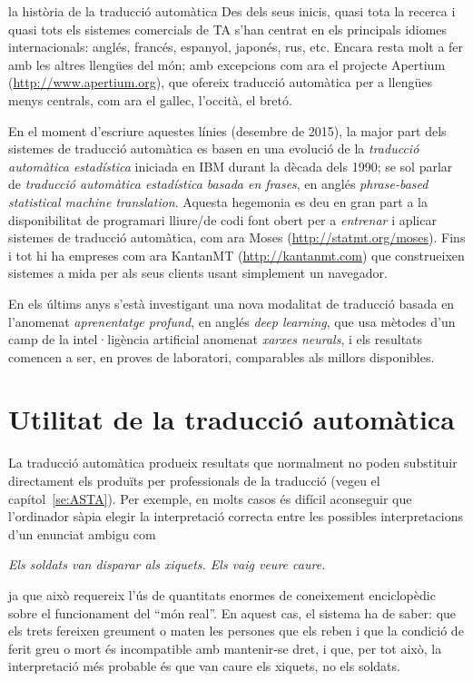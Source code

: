 \begin{persabermes}{la història de la traducció automàtica}
  Des dels seus inicis, quasi tota la recerca i quasi tots els
  sistemes comercials de TA s'han centrat en els principals idiomes
  internacionals: anglés, francés, espanyol, japonés, rus, etc.
  Encara resta molt a fer amb les altres llengües del món; amb
  excepcions com ara el projecte Apertium
  (\url{http://www.apertium.org}), que ofereix traducció automàtica
  per a llengües menys centrals, com ara el gallec, l'occità, el
  bretó.

  En el moment d'escriure aquestes línies (desembre de 2015), la major
  part dels sistemes de traducció automàtica es basen en una evolució
  de la \emph{traducció automàtica estadística} iniciada en IBM durant
  la dècada dels 1990; se sol parlar de \emph{traducció automàtica
    estadística basada en frases}, en anglés \emph{phrase-based
    statistical machine translation}. Aquesta hegemonia es deu en gran
  part a la disponibilitat de programari lliure/de codi font obert per
  a \emph{entrenar} i aplicar sistemes de traducció automàtica, com
  ara Moses (\url{http://statmt.org/moses}). Fins i tot hi ha empreses
  com ara KantanMT (\url{http://kantanmt.com}) que construeixen
  sistemes a mida per als seus clients usant simplement un navegador.

  En els últims anys s'està investigant una nova modalitat de
  traducció basada en l'anomenat \emph{aprenentatge profund}, en
  anglés \emph{deep learning}, que usa mètodes d'un camp de la
  intel·ligència artificial anomenat \emph{xarxes neurals}, i els
  resultats comencen a ser, en proves de laboratori, comparables als
  millors disponibles.

\end{persabermes}


\section{Utilitat de la traducció automàtica}
\label{ss:UTA}
La traducció automàtica produeix resultats que normalment no poden
substituir directament els produïts per professionals de la traducció
(vegeu el capítol~\ref{se:ASTA}).  Per exemple, en molts casos és
difícil aconseguir que l'ordinador sàpia elegir la interpretació
correcta entre les possibles interpretacions d'un enunciat ambigu com
\begin{center}
  \emph{Els soldats van disparar als xiquets. Els vaig veure caure.}
\end{center} 
ja que això requereix l'ús de quantitats enormes de coneixement
enciclopèdic sobre el funcionament del ``món real''. En aquest cas, el
sistema ha de saber: que els trets fereixen greument o maten les
persones que els reben i que la condició de ferit greu o mort és
incompatible amb mantenir-se dret, i que, per tot això, la
interpretació més probable és que van caure els xiquets, no els
soldats.  

